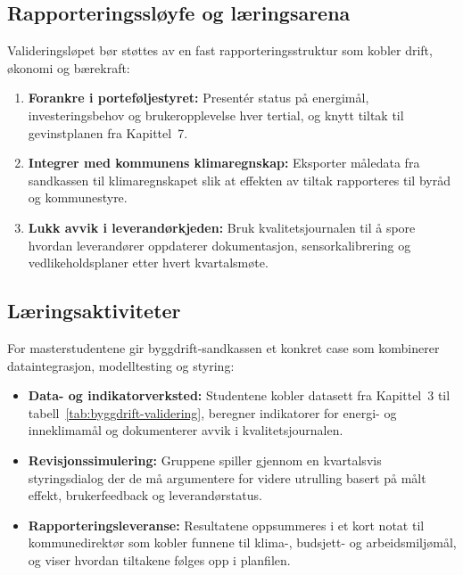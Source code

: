\subsection{Rapporteringssløyfe og læringsarena}
Valideringsløpet bør støttes av en fast rapporteringsstruktur som kobler drift, økonomi og bærekraft:
\begin{enumerate}
    \item \textbf{Forankre i porteføljestyret:} Presentér status på energimål, investeringsbehov og brukeropplevelse hver tertial, og knytt tiltak til gevinstplanen fra Kapittel~7.\citep{ks2024eiendomsdrift}
    \item \textbf{Integrer med kommunens klimaregnskap:} Eksporter måledata fra sandkassen til klimaregnskapet slik at effekten av tiltak rapporteres til byråd og kommunestyre.\citep{oslo2024klimaeiendom}
    \item \textbf{Lukk avvik i leverandørkjeden:} Bruk kvalitetsjournalen til å spore hvordan leverandører oppdaterer dokumentasjon, sensorkalibrering og vedlikeholdsplaner etter hvert kvartalsmøte.\citep{statsbygg2023digitalmodenhet}
\end{enumerate}

\subsection{Læringsaktiviteter}
For masterstudentene gir byggdrift-sandkassen et konkret case som kombinerer dataintegrasjon, modelltesting og styring:
\begin{itemize}
    \item \textbf{Data- og indikatorverksted:} Studentene kobler datasett fra Kapittel~3 til tabell~\ref{tab:byggdrift-validering}, beregner indikatorer for energi- og inneklimamål og dokumenterer avvik i kvalitetsjournalen.
    \item \textbf{Revisjonssimulering:} Gruppene spiller gjennom en kvartalsvis styringsdialog der de må argumentere for videre utrulling basert på målt effekt, brukerfeedback og leverandørstatus.
    \item \textbf{Rapporteringsleveranse:} Resultatene oppsummeres i et kort notat til kommunedirektør som kobler funnene til klima-, budsjett- og arbeidsmiljømål, og viser hvordan tiltakene følges opp i planfilen.
\end{itemize}

